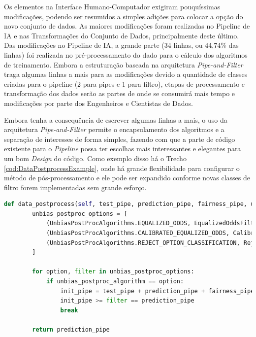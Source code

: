 \documentclass[portugues]{ic-tese}
\begin{document}
Os elementos na Interface Humano-Computador exigiram pouquíssimas modificações, podendo ser resumidos a simples adições para colocar a opção do novo conjunto de dados. As maiores modificações foram realizadas no Pipeline de IA e nas Transformações do Conjunto de Dados, principalmente deste último. Das modificações no Pipeline de IA, a grande parte (34 linhas, ou 44,74\% das linhas) foi realizada no pré-processamento do dado para o cálculo dos algoritmos de treinamento. Embora a estruturação baseada na arquitetura \textit{Pipe-and-Filter} traga algumas linhas a mais para as modificações devido a quantidade de classes criadas para o pipeline (2 para pipes e 1 para filtro), etapas de processamento e transformação dos dados serão as partes de onde se consumirá mais tempo e modificações por parte dos Engenheiros e Cientistas de Dados.

Embora tenha a consequência de escrever algumas linhas a mais, o uso da arquitetura \textit{Pipe-and-Filter} permite o encapsulamento dos algoritmos e a separação de interesses de forma simples, fazendo com que a parte de código existente para o \textit{Pipeline} possa ter escolhas mais interessantes e elegantes para um bom \textit{Design} do código. Como exemplo disso há o Trecho \ref{cod:DataPostprocessExample}, onde há grande flexibilidade para configurar o método de pós-processamento e ele pode ser expandido conforme novas classes de filtro forem implementadas sem grande esforço.

\begin{lstlisting}[language=Python, caption=Método para escolha do algoritmo com redução de viés no pós-processamento,label=cod:DataPostprocessExample]
    def data_postprocess(self, test_pipe, prediction_pipe, fairness_pipe, unbias_postproc_algorithm):
        unbias_postproc_options = [
            (UnbiasPostProcAlgorithms.EQUALIZED_ODDS, EqualizedOddsFilter()),
            (UnbiasPostProcAlgorithms.CALIBRATED_EQUALIZED_ODDS, CalibratedEqualizedOddsFilter()),
            (UnbiasPostProcAlgorithms.REJECT_OPTION_CLASSIFICATION, RejectOptionClassificationFilter())
        ]

        for option, filter in unbias_postproc_options:
            if unbias_postproc_algorithm == option:
                init_pipe = test_pipe + prediction_pipe + fairness_pipe['unprivileged_group', 'privileged_group']
                init_pipe >= filter == prediction_pipe
                break

        return prediction_pipe
\end{lstlisting}
\end{document}
